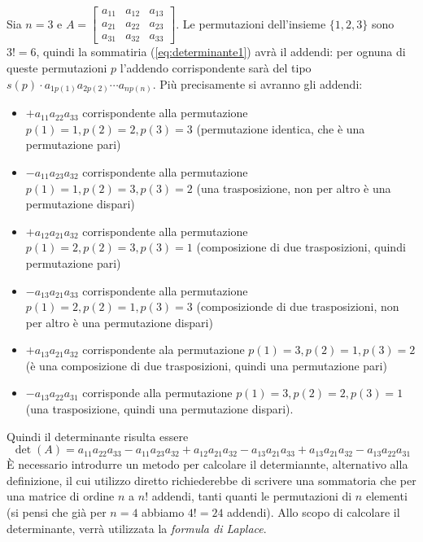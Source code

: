 Sia $n=3$ e $A=
\begin{bmatrix}
  a_{11} & a_{12} & a_{13}\\
  a_{21} & a_{22} & a_{23}\\
  a_{31} & a_{32} & a_{33}
\end{bmatrix}
$. Le permutazioni dell'insieme $\{1,2,3\}$ sono $3!=6$, quindi la sommatiria
(\ref{eq:determinante1}) avrà il addendi: per ognuna di queste permutazioni $p$
l'addendo corrispondente sarà del tipo $s(p)\cdot a_{1p(1)}a_{2p(2)}\cdots a_{np(n)}$.
Più precisamente si avranno gli addendi:
\begin{itemize}
\item $+a_{11}a_{22}a_{33}$ corrispondente alla permutazione $p(1)=1,p(2)=2, p(3)=3$
  (permutazione identica, che è una permutazione pari)
\item $-a_{11}a_{23}a_{32}$ corrispondente alla permutazione $p(1)=1,p(2)=3, p(3)=2$
  (una trasposizione, non per altro è una permutazione dispari)
\item $+a_{12}a_{21}a_{32}$ corrispondente alla permutazione $p(1)=2,p(2)=3, p(3)=1$
  (composizione di due trasposizioni, quindi permutazione pari)
\item $-a_{13}a_{21}a_{33}$ corrispondente alla permutazione $p(1)=2,p(2)=1, p(3)=3$
  (composizionde di due trasposizioni, non per altro è una permutazione dispari)
\item $+a_{13}a_{21}a_{32}$ corrispondente ala permutazione
  $p(1)=3,p(2)=1,p(3)=2$ (è una composizione di due trasposizioni, quindi
  una permutazione pari)
\item $-a_{13}a_{22}a_{31}$ corrisponde alla permutazione $p(1)=3, p(2)=2, p(3)=1$ (una trasposizione, quindi una permutazione dispari).
\end{itemize}
Quindi il determinante risulta essere
\begin{equation*}
  \det(A)=a_{11}a_{22}a_{33}-a_{11}a_{23}a_{32}+a_{12}a_{21}a_{32}-a_{13}a_{21}a_{33}+a_{13}a_{21}a_{32}-a_{13}a_{22}a_{31}
\end{equation*}
È necessario introdurre un metodo per calcolare il determiannte,
alternativo alla definizione, il cui utilizzo diretto richiederebbe di
scrivere una sommatoria che per una matrice di ordine $n$ a $n!$ addendi,
tanti quanti le permutazioni di $n$ elementi (si pensi che già per $n=4$
abbiamo $4!=24$ addendi). Allo scopo di calcolare il determinante,
verrà utilizzata la \textit{formula di Laplace}.

